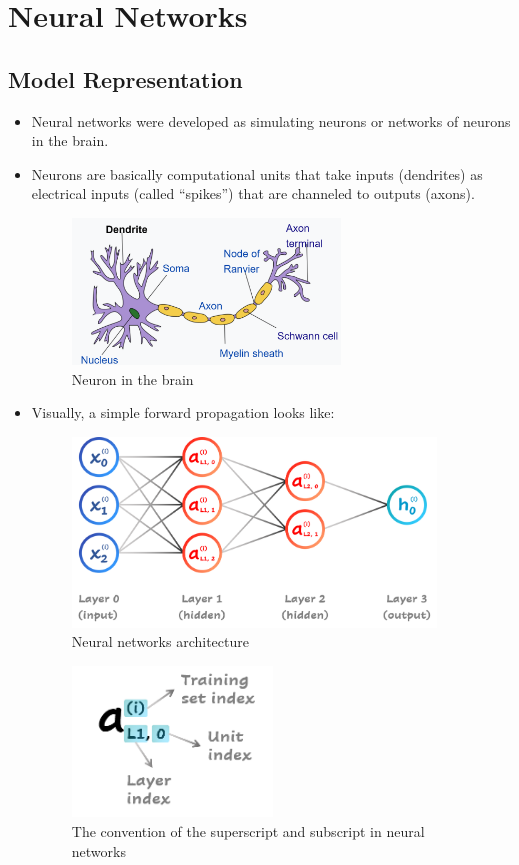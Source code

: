 \chapter{Neural Networks}


\section{Model Representation}
\begin{itemize}
    \item Neural networks were developed as simulating neurons or networks of neurons in the brain.
    \item Neurons are basically computational units that take inputs (dendrites) as electrical inputs (called ``spikes'') that are channeled to outputs (axons).
    \begin{figure}[H]
        \centering
        \includegraphics[width=2.8in]{./images/neuron.png}
        \caption{Neuron in the brain}
    \end{figure}
    
    \item Visually, a simple forward propagation looks like:
    \begin{figure}[H]
        \centering
        \includegraphics[width=3.8in]{./images/neuron_networks_architecture.png}
        \caption{Neural networks architecture}
    \end{figure}

    \begin{figure}[H]
        \centering
        \includegraphics[width=2.1in]{./images/super_subscript.png}
        \caption{The convention of the superscript and subscript in neural networks}
    \end{figure}
    

\end{itemize}
